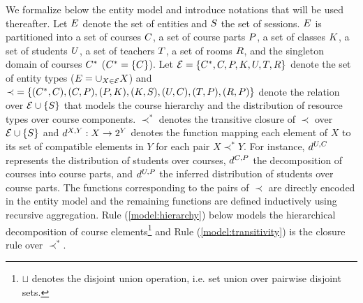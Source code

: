 We formalize below the entity model and introduce notations that will be used thereafter.
Let ${E}$ denote the set of entities
and ${S}$ the set of sessions.
${E}$ is partitioned into   
a set of courses ${C}$, 
a set of course parts ${P}$, 
a set of classes ${K}$, 
a set of students ${U}$, 
a set of teachers ${T}$,
a set of rooms ${R}$,
and the singleton domain of courses ${C^{*}}$ 
(${C^{*}}=\{C\}$). 
Let 
$
{\mathcal{E}}
=
\{
{C^{*}}, 
{C},
{P},
{K},
{U},
{T},
{R}
\}
$
denote the set of entity types
(${E}=\cup_{X \in \mathcal{E}}X$)
and 
$
{\prec}
=
\{
({C^{*}},{C}),
({C},{P}),
({P},{K}),
({K},{S}),
({U},{C}),
({T},{P}),
({R},{P})
\}
$
denote the relation over 
${\mathcal{E}}\cup\{S\}$ 
that models the course hierarchy
and the distribution of resource types over course components.
${\prec^{*}}$
denotes the transitive %
closure of
${\prec}$ 
over
${\mathcal{E}}\cup\{S\}$
and
${d^{X,Y}}:X\rightarrow2^{Y}$
denotes the function mapping each element of $X$ to its set of compatible elements in $Y$
for each pair %
$X{\prec^{*}}Y$.
For instance, 
${d^{U,C}}$ 
represents the distribution of students over courses, 
${d^{C,P}}$ 
the decomposition of courses into course parts,
and ${d^{U,P}}$ 
the inferred distribution of students over course parts.
The functions corresponding to the pairs of $\prec$
are directly encoded in the entity model
and the remaining functions are defined inductively using recursive aggregation. 
Rule (\ref{model:hierarchy}) below models the hierarchical decomposition of course elements\footnote{$\sqcup$ denotes the disjoint union operation, i.e. set union over pairwise disjoint sets.}
and
Rule (\ref{model:transitivity}) is the closure rule over 
$\prec^{*}$. 



